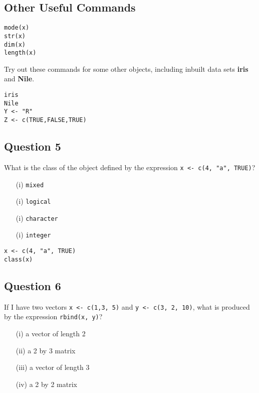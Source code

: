 \documentclass[12pt]{article}
\begin{document}
\subsection*{Other Useful Commands}
\begin{framed}
\begin{verbatim}
mode(x)
str(x)
dim(x)
length(x)
\end{verbatim}	
\end{framed}

\noindent Try out these commands for some other objects, including inbuilt data sets \textbf{iris} and \textbf{Nile}.

\begin{framed}
\begin{verbatim}
iris   
Nile
Y <- "R"
Z <- c(TRUE,FALSE,TRUE)
\end{verbatim}
\end{framed}
\newpage
\subsection*{Question 5}
\Large
What is the class of the object defined by the expression \texttt{x <- c(4, "a", TRUE)}?
\begin{itemize}
	\item[(i)] \texttt{mixed}
	\item[(i)] \texttt{logical}
	\item[(i)] \texttt{character}
	\item[(i)] \texttt{integer}
\end{itemize}

\begin{framed}
\begin{verbatim}
x <- c(4, "a", TRUE)
class(x)
\end{verbatim}	
\end{framed}
\newpage
\subsection*{Question 6}
\Large
If I have two vectors \texttt{x <- c(1,3, 5)} and \texttt{y <- c(3, 2, 10)}, what is produced by the expression 
\texttt{rbind(x, y)}?

\begin{itemize}
	\item[(i)] a vector of length 2
	\item[(ii)] a 2 by 3 matrix
	\item[(iii)] a vector of length 3
	\item[(iv)] a 2 by 2 matrix
\end{itemize}
\end{document}
